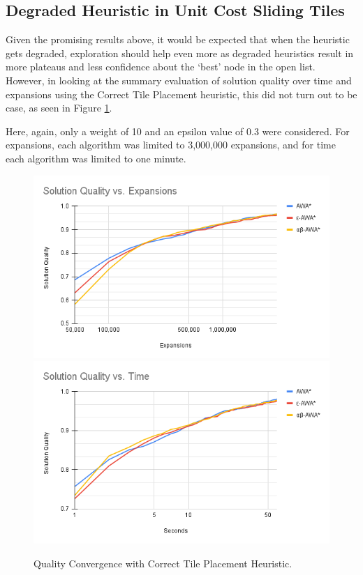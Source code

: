 \subsection{Degraded Heuristic in Unit Cost Sliding Tiles}
Given the promising results above, it would be expected that when the heuristic gets degraded, exploration should help even more as degraded heuristics result in more plateaus and less confidence about the `best' node in the open list. However, in looking at the summary evaluation of solution quality over time and expansions using the Correct Tile Placement heuristic, this did not turn out to be case, as seen in Figure \ref{fig:conv-correct}.

Here, again, only a weight of 10 and an epsilon value of 0.3 were considered. For expansions, each algorithm was limited to 3,000,000 expansions, and for time each algorithm was limited to one minute. 

\begin{figure}
    \includegraphics[width=\linewidth]{media/correct-Solution Quality vs. Expansions.png}
    \includegraphics[width=\linewidth]{media/correct-Solution Quality vs. Time.png}
    \caption{Quality Convergence with Correct Tile Placement Heuristic.} \label{fig:conv-correct}
\end{figure}

